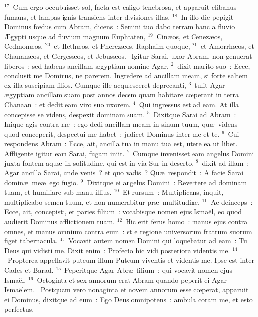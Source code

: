 ${}^{17}$~Cum ergo occubuisset sol, facta est caligo tenebrosa, et apparuit clibanus fumans, et lampas ignis transiens inter divisiones illas.
${}^{18}$~In illo die pepigit Dominus fœdus cum Abram, dicens~: Semini tuo dabo terram hanc a fluvio \AE gypti usque ad fluvium magnum Euphraten,
${}^{19}$~Cin\ae os, et Cenez\ae os, Cedmon\ae os,
${}^{20}$~et Heth\ae os, et Pherez\ae os, Raphaim quoque,
${}^{21}$~et Amorrh\ae os, et Chanan\ae os, et Gerges\ae os, et Jebus\ae os.
~Igitur Sarai, uxor Abram, non genuerat liberos~: sed habens ancillam \ae gyptiam nomine Agar,
${}^{2}$~dixit marito suo~: Ecce, conclusit me Dominus, ne parerem. Ingredere ad ancillam meam, si forte saltem ex illa suscipiam filios. Cumque ille acquiesceret deprecanti,
${}^{3}$~tulit Agar \ae gyptiam ancillam suam post annos decem quam habitare cœperant in terra Chanaan~: et dedit eam viro suo uxorem.
${}^{4}$~Qui ingressus est ad eam. At illa concepisse se videns, despexit dominam suam.
${}^{5}$~Dixitque Sarai ad Abram~: Inique agis contra me~: ego dedi ancillam meam in sinum tuum, qu\ae\ videns quod conceperit, despectui me habet~: judicet Dominus inter me et te.
${}^{6}$~Cui respondens Abram~: Ecce, ait, ancilla tua in manu tua est, utere ea ut libet. Affligente igitur eam Sarai, fugam iniit.
${}^{7}$~Cumque invenisset eam angelus Domini juxta fontem aqu\ae\ in solitudine, qui est in via Sur in deserto,
${}^{8}$~dixit ad illam~: Agar ancilla Sarai, unde venis~? et quo vadis~? Qu\ae\ respondit~: A facie Sarai domin\ae\ me\ae\ ego fugio.
${}^{9}$~Dixitque ei angelus Domini~: Revertere ad dominam tuam, et humiliare sub manu illius.
${}^{10}$~Et rursum~: Multiplicans, inquit, multiplicabo semen tuum, et non numerabitur pr\ae\ multitudine.
${}^{11}$~Ac deinceps~: Ecce, ait, concepisti, et paries filium~: vocabisque nomen ejus Isma\"el, eo quod audierit Dominus afflictionem tuam.
${}^{12}$~Hic erit ferus homo~: manus ejus contra omnes, et manus omnium contra eum~: et e regione universorum fratrum suorum figet tabernacula.
${}^{13}$~Vocavit autem nomen Domini qui loquebatur ad eam~: Tu Deus qui vidisti me. Dixit enim~: Profecto hic vidi posteriora videntis me.
${}^{14}$~Propterea appellavit puteum illum Puteum viventis et videntis me. Ipse est inter Cades et Barad.
${}^{15}$~Peperitque Agar Abr\ae\ filium~: qui vocavit nomen ejus Isma\"el.
${}^{16}$~Octoginta et sex annorum erat Abram quando peperit ei Agar Isma\"elem.
~Postquam vero nonaginta et novem annorum esse cœperat, apparuit ei Dominus, dixitque ad eum~: Ego Deus omnipotens~: ambula coram me, et esto perfectus.
